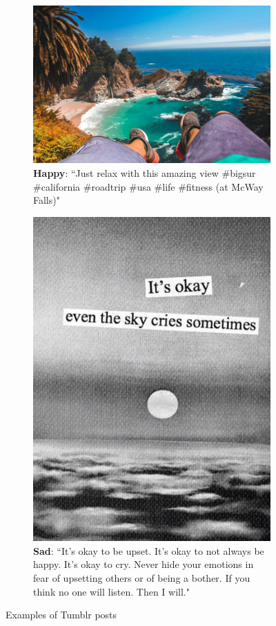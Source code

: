 \documentclass{article} %
\begin{document}
\begin{figure}[H]
    \begin{subfigure}[t]{.5\textwidth}
        \vskip 0pt %
        \centering
        \includegraphics[width=.8\linewidth]{Images/happy.jpg}
        \caption{\textbf{Happy}: ``Just relax with this amazing view \#bigsur \#california \#roadtrip \#usa \#life \#fitness (at McWay Falls)"}
   \end{subfigure}
   \begin{subfigure}[t]{.5\textwidth}
       \vskip 0pt
       \centering
       \includegraphics[width=.5\linewidth]{Images/sad.jpg}
       \caption{\textbf{Sad}: ``It's okay to be upset. It's okay to not always be happy. It's okay to cry. Never hide your emotions in fear of upsetting others or of being a bother. If you think no one will listen. Then I will."}
    \end{subfigure}
    \caption{Examples of Tumblr posts}
    \label{fig:emotions}
\end{figure}
\end{document}
